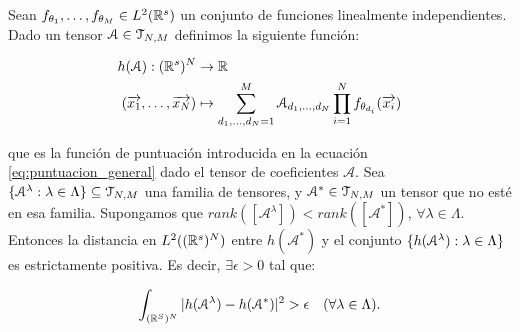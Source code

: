 \begin{lema} \label{lema:lema_previo_corolario}
    Sean $f_{\theta_1}, \ldots, f_{\theta_M} \in L^2(\mathbb{R}^s)$ un conjunto de funciones linealmente independientes. Dado un tensor $\mathcal{A} \in \mathcal{T}_{N, M}$ definimos la siguiente función:

    \begin{equation}
        \begin{split}
            h(\mathcal{A}): (\mathbb{R}^s)^N &\to \mathbb{R} \\
            (\overrightarrow{x_1}, \ldots, \overrightarrow{x_N}) &\mapsto \sum_{d_1, \ldots, d_N = 1}^M \mathcal{A}_{d_1, \ldots, d_N} \prod_{i = 1}^N f_{\theta_{d_i}}(\overrightarrow{x_i})
        \end{split}
    \end{equation}

    que es la función de puntuación introducida en la ecuación \eqref{eq:puntuacion_general} dado el tensor de coeficientes $\mathcal{A}$. Sea $\{ \mathcal{A}^\lambda: \lambda \in \Lambda \} \subseteq \mathcal{T}_{N, M}$ una familia de tensores, y $\mathcal{A}^* \in \mathcal{T}_{N, M}$ un tensor que no esté en esa familia. Supongamos que $rank([\mathcal{A}^\lambda]) < rank([\mathcal{A}^*])$, $\forall \lambda \in \Lambda$. Entonces la distancia en $L^2((\mathbb{R}^s)^N)$ entre $h(\mathcal{A}^*)$ y el conjunto $\{ h(\mathcal{A}^\lambda): \lambda \in \Lambda \}$ es estrictamente positiva. Es decir, $\exists \epsilon > 0$ tal que:

    \begin{equation}
        \int_{(\mathbb{R}^S)^N} |h(\mathcal{A}^\lambda) - h(\mathcal{A}^*)|^2 > \epsilon \quad (\forall \lambda \in \Lambda).
    \end{equation}
\end{lema}

